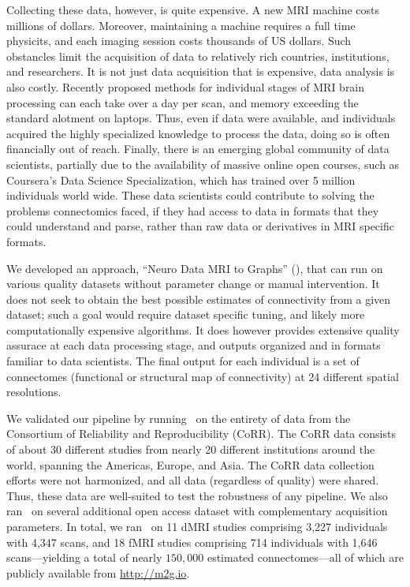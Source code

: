 \documentclass[11pt]{article}
\begin{document}
\begin{multicols}{2}
Collecting these data, however, is quite expensive.  A new MRI machine costs millions of dollars.  Moreover, maintaining a machine requires a full time physicits, and each imaging session  costs thousands of US dollars.  Such obstancles limit the acquisition of data to relatively rich countries, institutions, and researchers.  It is not just data acquisition that is expensive, data analysis is also costly.  Recently proposed methods for individual stages of MRI brain processing can each take over a day per scan, and memory exceeding the standard alotment on laptops.  Thus, even if data were available, and individuals acquired the highly specialized knowledge to process the data, doing so is often financially out of reach.  Finally, there is an emerging global community of data scientists, partially due to the availability of massive online open courses, such as Coursera's Data Science Specialization, which has trained over 5 million individuals world wide.  These data scientists could contribute to solving the problems connectomics faced, if they had access to data in formats that they could understand and parse, rather than raw data or derivatives in MRI specific formats. 




We developed an approach, ``Neuro Data MRI to Graphs'' (\ndmg), that 
can run on various quality datasets without parameter change or manual intervention. It does not seek to obtain the best possible estimates of connectivity from a given dataset; such a goal would require dataset specific tuning, and likely more computationally expensive algorithms. It does however provides extensive quality assurace at each data processing stage, and outputs organized and in formats familiar to data scientists.  The final output for each individual is a set of connectomes (functional or structural map of connectivity) at 24 different spatial resolutions.



We validated our pipeline by running \ndmg~on the entirety of data from the Consortium of Reliability and Reproducibility (CoRR).  The CoRR data  consists of about 30 different studies from nearly 20 different institutions around the world, spanning the Americas, Europe, and Asia. The CoRR data collection efforts were not harmonized, and all data (regardless of quality) were shared.  Thus, these data are well-suited to test the robustness of any pipeline.  We also ran \ndmg~on several additional open access dataset with complementary acquisition parameters. In total, we ran \ndmg~on 11 dMRI  studies comprising 3,227 individuals with 4,347 scans, and 18 fMRI  studies comprising 714 individuals with 1,646 scans---yielding a total of nearly  $150,000$ estimated connectomes---all of which are publicly available from \url{http://m2g.io}. 


\end{multicols}
\end{document}
